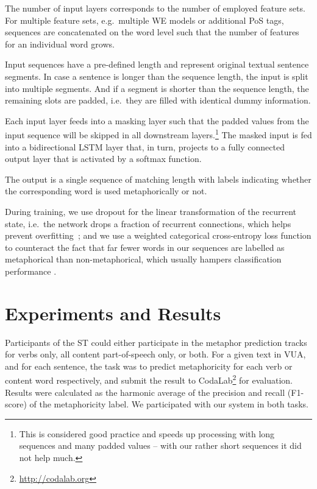 \documentclass[11pt,a4paper]{article}
\begin{document}
The number of input layers corresponds to the number of employed feature sets. 
For multiple feature sets, e.g.~multiple WE models or additional PoS tags, sequences are concatenated on the word level such that the number of features for an individual word grows.

Input sequences have a pre-defined length and represent original textual sentence segments.
In case a sentence is longer than the sequence length, the input is split into multiple segments. 
And if a segment is shorter than the sequence length, the remaining slots are padded, i.e.~they are filled with identical dummy information.

Each input layer feeds into a masking layer such that the padded values from the input sequence will be skipped in all downstream layers.\footnote{This is considered good practice and speeds up processing with long sequences and many padded values -- with our rather short sequences it did not help much.}
The masked input is fed into a bidirectional LSTM layer that, in turn, projects to a fully connected output layer that is activated by a softmax function.

The output is a single sequence of matching length with labels indicating whether the corresponding word is used metaphorically or not.

During training, we use dropout for the linear transformation of the recurrent state, i.e.~the network drops a fraction of recurrent connections, 
which helps prevent overfitting~\cite{Srivastava2014}; 
and we use a weighted categorical cross-entropy loss function to counteract the fact that far fewer words in our sequences are labelled as metaphorical than non-metaphorical, which usually hampers classification performance \cite[cf.][]{Kotsiantis2006}.



\section{Experiments and Results} %
\label{sec:results}

Participants of the ST could either participate in the metaphor prediction tracks for verbs only, all content part-of-speech only, or both. 
For a given text in VUA, and for each sentence, the task was to predict metaphoricity for each verb or content word respectively, and submit the result to CodaLab\footnote{\url{http://codalab.org}} for evaluation. 
Results were calculated as the harmonic average of the precision and recall (F1-score) of the metaphoricity label.
We participated with our system in both tasks.
\end{document}
